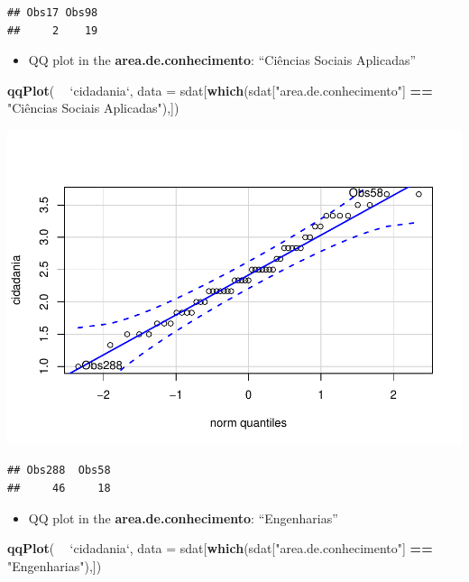 \documentclass[]{article}
\newenvironment{Shaded}{\begin{snugshade}}{\end{snugshade}}
\newcommand{\DataTypeTok}[1]{\textcolor[rgb]{0.13,0.29,0.53}{#1}}
\newcommand{\KeywordTok}[1]{\textcolor[rgb]{0.13,0.29,0.53}{\textbf{#1}}}
\newcommand{\NormalTok}[1]{#1}
\newcommand{\OperatorTok}[1]{\textcolor[rgb]{0.81,0.36,0.00}{\textbf{#1}}}
\newcommand{\StringTok}[1]{\textcolor[rgb]{0.31,0.60,0.02}{#1}}
\providecommand{\tightlist}{%
  \setlength{\itemsep}{0pt}\setlength{\parskip}{0pt}}
\begin{document}
\begin{verbatim}
## Obs17 Obs98 
##     2    19
\end{verbatim}

\begin{itemize}
\tightlist
\item
  QQ plot in the \textbf{area.de.conhecimento}: ``Ciências Sociais
  Aplicadas''
\end{itemize}

\begin{Shaded}
\begin{Highlighting}[]
\KeywordTok{qqPlot}\NormalTok{( }\OperatorTok{~}\StringTok{ `}\DataTypeTok{cidadania}\StringTok{`}\NormalTok{, }\DataTypeTok{data =}\NormalTok{ sdat[}\KeywordTok{which}\NormalTok{(sdat[}\StringTok{"area.de.conhecimento"}\NormalTok{] }\OperatorTok{==}\StringTok{ "Ciências Sociais Aplicadas"}\NormalTok{),])}
\end{Highlighting}
\end{Shaded}

\includegraphics{factorialAnova_files/figure-latex/unnamed-chunk-27-1.pdf}

\begin{verbatim}
## Obs288  Obs58 
##     46     18
\end{verbatim}

\begin{itemize}
\tightlist
\item
  QQ plot in the \textbf{area.de.conhecimento}: ``Engenharias''
\end{itemize}

\begin{Shaded}
\begin{Highlighting}[]
\KeywordTok{qqPlot}\NormalTok{( }\OperatorTok{~}\StringTok{ `}\DataTypeTok{cidadania}\StringTok{`}\NormalTok{, }\DataTypeTok{data =}\NormalTok{ sdat[}\KeywordTok{which}\NormalTok{(sdat[}\StringTok{"area.de.conhecimento"}\NormalTok{] }\OperatorTok{==}\StringTok{ "Engenharias"}\NormalTok{),])}
\end{Highlighting}
\end{Shaded}
\end{document}
